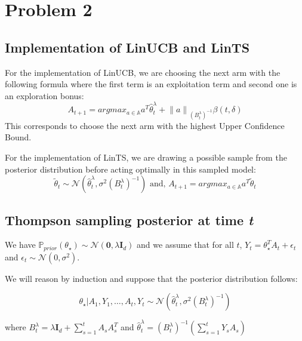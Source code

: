 \section{Problem 2}

\subsection{Implementation of \textbf{LinUCB} and \textbf{LinTS}}
For the implementation of LinUCB, we are choosing the next arm with the following formula where the first term is an exploitation term and 
second one is an exploration bonus:
\[ A_{t+1} = argmax_{a \in \mathbb{A}} a^T \hat \theta_t^{\lambda} + {\lVert a \rVert}_{{(B_t^{\lambda})}^{-1}} \beta(t,\delta) \]
This corresponds to choose the next arm with the highest Upper Confidence Bound.

For the implementation of LinTS, we are drawing a possible sample from the posterior distribution before acting optimally in this sampled model:
\[ \tilde{\theta}_t \sim \mathcal{N}(\hat \theta_t^{\lambda}, 
   \sigma^2{(B_t^{\lambda})}^{-1}) \text{ and, } A_{t+1} = argmax_{a \in \mathbb{A}} a^T \tilde{\theta}_t\]


\subsection{Thompson sampling posterior at time \emph{t}}
We have $\mathbb{P}_{prior}(\theta_{\star}) \sim \mathcal{N}(\mathbf{0}, \lambda \mathbf{I}_d)$ and we assume that for all $t$, $Y_{t} = \theta_{\star}^TA_t + \epsilon_t$ and $\epsilon_t \sim \mathcal{N}(0, \sigma^2)$.

We will reason by induction and suppose that the posterior distribution follows:

\[
\theta_{\star}|A_1, Y_1, \dots, A_t, Y_t \sim \mathcal{N}(\hat\theta_t^{\lambda}, \sigma^2{(B_t^{\lambda})}^{-1})
\]

where $B_t^{\lambda} = \lambda \mathbf{I}_d + \sum_{s=1}^t A_s A_s^T$ and $\hat\theta_t^{\lambda} = {(B_t^{\lambda})}^{-1} (\sum_{s=1}^t Y_s A_s)$

